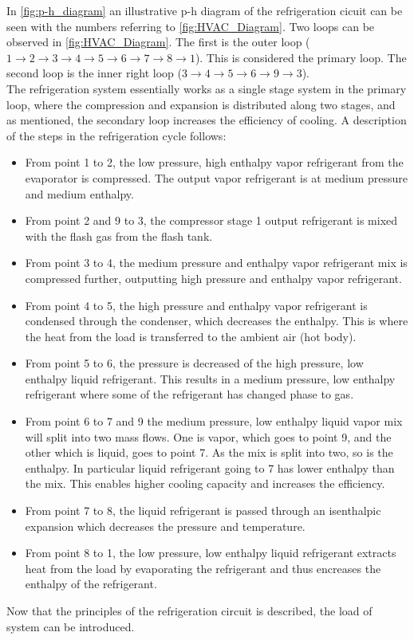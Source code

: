 In \cref{fig:p-h_diagram} an illustrative p-h diagram of the refrigeration cicuit can be seen with the numbers referring to \cref{fig:HVAC_Diagram}. Two loops can be observed in \cref{fig:HVAC_Diagram}. The first is the outer loop ($1 \rightarrow 2\rightarrow 3 \rightarrow 4 \rightarrow 5 \rightarrow 6 \rightarrow 7 \rightarrow 8 \rightarrow 1$). This is considered the primary loop. The second loop is the inner right loop ($3 \rightarrow 4 \rightarrow 5 \rightarrow 6 \rightarrow 9 \rightarrow 3$). \\
The refrigeration system essentially works as a single stage system in the primary loop, where the compression and expansion is distributed along two stages, and as mentioned, the secondary loop  increases the efficiency of cooling. A description of the steps in the refrigeration cycle follows:
\begin{itemize}
	\item From point 1 to 2, the low pressure, high enthalpy vapor refrigerant from the evaporator is compressed. The output vapor refrigerant is at medium pressure and medium enthalpy. 
	\item From point 2 and 9 to 3, the compressor stage 1 output refrigerant is mixed with the flash gas from the flash tank. 
	\item From point 3 to 4, the medium pressure and enthalpy vapor refrigerant mix is compressed further, outputting high pressure and enthalpy vapor refrigerant.
	\item From point 4 to 5, the high pressure and enthalpy vapor refrigerant is condensed through the condenser, which decreases the enthalpy. This is where the heat from the load is transferred to the ambient air (hot body).
	\item From point 5 to 6, the pressure is decreased of the high pressure, low enthalpy liquid refrigerant. This results in a medium pressure, low enthalpy refrigerant where some of the refrigerant has changed phase to gas.
	\item From point 6 to 7 and 9 the medium pressure, low enthalpy liquid vapor mix will split into two mass flows. One is vapor, which goes to point 9, and the other which is liquid, goes to point 7. As the mix is split into two, so is the enthalpy. In particular liquid refrigerant going to 7 has lower enthalpy than the mix. This enables higher cooling capacity and increases the efficiency.
	\item From point 7 to 8, the liquid refrigerant is passed through an isenthalpic expansion which decreases the pressure and temperature.
	\item From point 8 to 1, the low pressure, low enthalpy liquid refrigerant extracts heat from the load by evaporating the refrigerant and thus encreases the enthalpy of the refrigerant.
\end{itemize}
Now that the principles of the refrigeration circuit is described, the load of system can be introduced. \\

